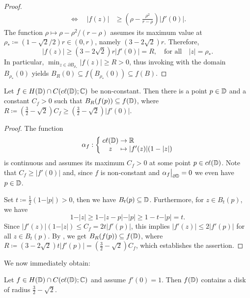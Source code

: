 \begin{proof}
\begin{align*}
        \Longleftrightarrow \quad \vert f(z) \vert &\geq \left( \rho - \frac{\rho^2}{r - \rho} \right) \vert f'(0) \vert.
    \end{align*}
    The function $\rho \mapsto \rho - \rho^2 / (r - \rho)$ assumes its maximum value at $\rho_* \coloneqq (1 - \sqrt{2} / 2)r \in (0, r)$, namely $(3 - 2 \sqrt{2}) r$. Therefore,
    \begin{equation*}
        \vert f(z) \vert \geq (3 - 2 \sqrt{2}) r \vert f'(0) \vert = R, \quad \textrm{for all} \quad \vert z \vert = \rho_*.
    \end{equation*}
    In particular, $\min_{z \in \partial B_{\rho_*}} \vert f(z) \vert \geq R > 0$, thus invoking  with the domain $B_{\rho_*}(0)$ yields $B_{R}(0) \subseteq f(B_{\rho_*}(0)) \subseteq f(B)$.
\end{proof}

\begin{theorem} \label{thm:bloch-stronger}
    Let $f \in H(\mathbb{D}) \cap C(c\ell({\mathbb{D}}); \mathbb{C})$ be non-constant. Then there is a point $p \in \mathbb{D}$ and a constant $C_f > 0$ such that $B_{R}(f(p)) \subseteq f(\mathbb{D})$, where $R \coloneqq (\frac{3}{2} - \sqrt{2}) C_f \geq (\frac{3}{2} - \sqrt{2}) \vert f'(0) \vert$.
\end{theorem}

\begin{proof}
    The function
    $$ \mapping{\alpha_f}{\cl{\D} & \to & \R}{z & \mapsto & \vert f'(z) \vert (1 - \vert z \vert)} $$
    is continuous and assumes its maximum $C_f > 0$ at some point $p \in c\ell({\mathbb{D}})$. Note that $C_f \geq \vert f'(0) \vert$ and, since $f$ is non-constant and $\restr{\alpha_f}{\partial \D} = 0$ we even have $p \in \mathbb{D}$.

    Set $t \coloneqq \frac{1}{2}(1 - \vert p \vert) > 0$, then we have $B_{t}(p) \subseteq \mathbb{D}$. Furthermore, for $z \in B_t(p)$, we have
    $$ 1 - \vert z \vert \geq 1 - \vert z - p \vert - \vert p \vert \geq 1 - t - \vert p \vert = t. $$
    Since $\vert f'(z) \vert (1 - \vert z \vert) \leq C_f = 2 t \vert f'(p) \vert$, this implies $\vert f'(z) \vert \leq 2 \vert f'(p) \vert$ for all $z \in B_t(p)$. By , we get $ B_{R}(f(p)) \subseteq f(\mathbb{D}) $, where $R \coloneqq (3 - 2 \sqrt{2}) t \vert f'(p) \vert = ({\textstyle \frac{3}{2}} - \sqrt{2}) C_f$,
    which establishes the assertion.
\end{proof}

We now immediately obtain:    

\begin{theorem}[Bloch] \label{thm:bloch}
    Let $f \in H(\mathbb{D}) \cap C(c\ell({\mathbb{D}}); \mathbb{C})$ and assume $f'(0) = 1$. Then $f(\mathbb{D})$ contains a disk of radius $\frac{3}{2} - \sqrt{2}$.
\end{theorem}

